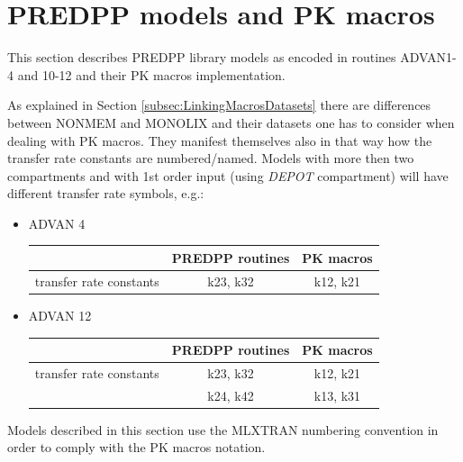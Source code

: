 \section{PREDPP models and PK macros}
\label{subsec:PREDPPinMACROS}
This section describes PREDPP library models as encoded in routines ADVAN1-4 and 10-12 
and their PK macros implementation. 

As explained in Section \ref{subsec:LinkingMacrosDatasets} there are differences between 
NONMEM and MONOLIX and their datasets one has to consider when dealing with PK macros.
They manifest themselves also in that way how the transfer rate constants are numbered/named. 
Models with more then two compartments and with 1st order input (using \emph{DEPOT} 
compartment) will have different transfer rate symbols, e.g.:
\begin{itemize}
\item
ADVAN 4

\begin{table}
\begin{center}
\begin{tabular}{lcc}
  \hline
  \hline
				 	& PREDPP routines 	& PK macros \\
  \hline
transfer rate constants 	& k23, k32 		& k12, k21  \\
   \hline
\end{tabular}
\end{center}
\end{table}
\item
ADVAN 12 

\begin{table}
\begin{center}
\begin{tabular}{lcc}
  \hline
  \hline
				 	& PREDPP routines 	& PK macros \\
  \hline
transfer rate constants 	& k23, k32 		& k12, k21  \\
					& k24, k42 		& k13, k31  \\
   \hline
\end{tabular}
\end{center}
\end{table}
\end{itemize}
Models described in this section use the MLXTRAN numbering convention in order to comply
with the PK macros notation.

